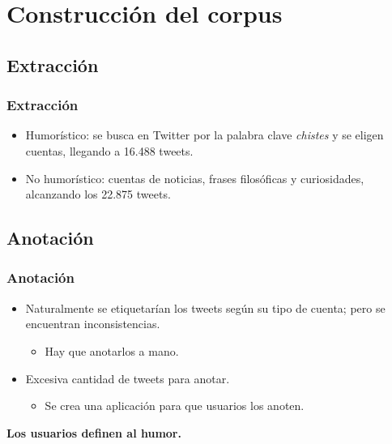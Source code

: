 \section{Construcción del corpus}

\subsection{Extracción}
\begin{frame}
    \frametitle{Extracción}

    \begin{itemize}
        \item Humorístico: se busca en Twitter por la palabra clave \emph{chistes} y se eligen cuentas, llegando a 16.488 tweets.
        \item No humorístico: cuentas de noticias, frases filosóficas y curiosidades, alcanzando los 22.875 tweets.
    \end{itemize}
\end{frame}

\subsection{Anotación}
\begin{frame}
    \frametitle{Anotación}

    \begin{itemize}
        \item Naturalmente se etiquetarían los tweets según su tipo de cuenta; pero se encuentran inconsistencias.

        \begin{itemize}
            \item Hay que anotarlos a mano.
        \end{itemize}

        \item Excesiva cantidad de tweets para anotar.

        \begin{itemize}
            \item Se crea una aplicación para que usuarios los anoten.
        \end{itemize}
    \end{itemize}

    \vspace{1cm}

    \begin{center}
        \bf
        Los usuarios definen al humor.
    \end{center}
\end{frame}

